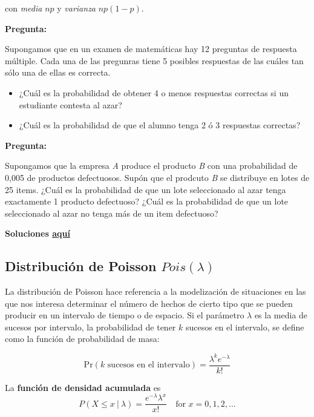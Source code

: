 \documentclass[]{article}
\def\tightlist{}
\numberwithin{equation}{section}
\begin{document}
con \emph{media} \(np\) y \emph{varianza} \(np(1-p)\).

\textbf{Pregunta:}

Supongamos que en un examen de matemáticas hay 12 preguntas de respuesta
múltiple. Cada una de las pregunras tiene 5 posibles respuestas de las
cuáles tan sólo una de ellas es correcta.

\begin{itemize}
\tightlist
\item
  ¿Cuál es la probabilidad de obtener 4 o menos respuestas correctas si
  un estudiante contesta al azar?
\end{itemize}

\begin{itemize}
\tightlist
\item
  ¿Cuál es la probabilidad de que el alumno tenga 2 ó 3 respuestas
  correctas?
\end{itemize}

\textbf{Pregunta:}

Supongamos que la empresa \emph{A} produce el producto \emph{B} con una
probabilidad de 0,005 de productos defectuosos. Supón que el prodcuto
\emph{B} se distribuye en lotes de 25 items. ¿Cuál es la probabilidad de
que un lote seleccionado al azar tenga exactamente 1 producto
defectuoso? ¿Cuál es la probabilidad de que un lote seleccionado al azar
no tenga más de un item defectuoso?

\textbf{Soluciones \href{IntroSM_sol.html}{aquí}}

\subsection{\texorpdfstring{Distribución de Poisson
\(Pois(\lambda)\)}{Distribución de Poisson Pois(\textbackslash{}lambda)}}\label{distribucion-de-poisson-poislambda}

La distribución de Poisson hace referencia a la modelización de
situaciones en las que nos interesa determinar el número de hechos de
cierto tipo que se pueden producir en un intervalo de tiempo o de
espacio. Si el parámetro \(\lambda\) es la media de sucesos por
intervalo, la probabilidad de tener \(k\) sucesos en el intervalo, se
define como la función de probabilidad de masa:

\[
\mbox{Pr}(\mbox{$k$ sucesos en el intervalo}) = \frac{\lambda^k e^{-\lambda}}{k!}
\]

La \textbf{función de densidad acumulada} es \[
P(X\leq x ~|~\lambda ) = \frac{e^{-\lambda} \lambda ^x}{x!}\quad \mbox{for $x=0,1,2,...$}
\]
\end{document}
